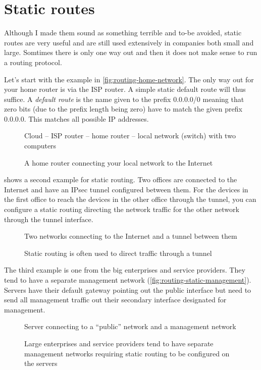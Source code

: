 \section{Static routes}
\label{sec:routing-static}

Although I made them sound as something terrible and to-be avoided, static routes are very useful and are still used extensively in companies both small and large.
Somtimes there is only one way out and then it does not make sense to run a routing protocol.

Let's start with the example in \vref{fig:routing-home-network}.
The only way out for your home router is via the ISP router.
A simple static default route will thus suffice.
A \emph{default route} is the name given to the prefix 0.0.0.0/0 meaning that zero bits (due to the prefix length being zero) have to match the given prefix 0.0.0.0.
This matches all possible IP addresses.


\begin{figure}
   \centering
   Cloud -- ISP router -- home router -- local network (switch) with two computers
   \caption{A home router connecting your local network to the Internet}
   \label{fig:routing-home-network}
\end{figure}


 shows a second example for static routing.
Two offices are connected to the Internet and have an IPsec  tunnel configured between them.
For the devices in the first office to reach the devices in the other office through the tunnel, you can configure a static routing directing the network traffic for the other network through the tunnel interface.


\begin{figure}
   \centering
   Two networks connecting to the Internet and a  tunnel between them
   \caption{Static routing is often used to direct traffic through a  tunnel}
   \label{fig:routing-static-vpn}
\end{figure}


The third example is one from the big enterprises and service providers.
They tend to have a separate management network (\vref{fig:routing-static-management}).
Servers have their default gateway pointing out the public interface but need to send all management traffic out their secondary interface designated for management.


\begin{figure}
   \centering
   Server connecting to a ``public'' network and a management network
   \caption{Large enterprises and service providers tend to have separate management networks requiring static routing to be configured on the servers}
   \label{fig:routing-static-management}
\end{figure}



